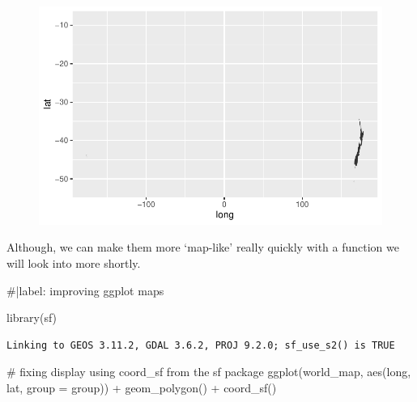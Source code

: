 \documentclass[
  letterpaper,
  DIV=11,
  numbers=noendperiod]{scrartcl}
\newenvironment{Shaded}{\begin{snugshade}}{\end{snugshade}}
\newcommand{\AttributeTok}[1]{\textcolor[rgb]{0.40,0.45,0.13}{#1}}
\newcommand{\CommentTok}[1]{\textcolor[rgb]{0.37,0.37,0.37}{#1}}
\newcommand{\FunctionTok}[1]{\textcolor[rgb]{0.28,0.35,0.67}{#1}}
\newcommand{\NormalTok}[1]{\textcolor[rgb]{0.00,0.23,0.31}{#1}}
\newcommand{\SpecialCharTok}[1]{\textcolor[rgb]{0.37,0.37,0.37}{#1}}
\begin{document}
\begin{figure}[H]

{\centering \includegraphics{Introduction-to-mapping_files/figure-pdf/unnamed-chunk-1-2.pdf}

}

\end{figure}

Although, we can make them more `map-like' really quickly with a
function we will look into more shortly.

\begin{Shaded}
\begin{Highlighting}[]
\CommentTok{\#|label: improving ggplot maps}

\FunctionTok{library}\NormalTok{(sf)}
\end{Highlighting}
\end{Shaded}

\begin{verbatim}
Linking to GEOS 3.11.2, GDAL 3.6.2, PROJ 9.2.0; sf_use_s2() is TRUE
\end{verbatim}

\begin{Shaded}
\begin{Highlighting}[]
\CommentTok{\# fixing display using coord\_sf from the sf package}
\FunctionTok{ggplot}\NormalTok{(world\_map, }\FunctionTok{aes}\NormalTok{(long, lat, }\AttributeTok{group =}\NormalTok{ group)) }\SpecialCharTok{+}
  \FunctionTok{geom\_polygon}\NormalTok{() }\SpecialCharTok{+}
  \FunctionTok{coord\_sf}\NormalTok{()}
\end{Highlighting}
\end{Shaded}
\end{document}

